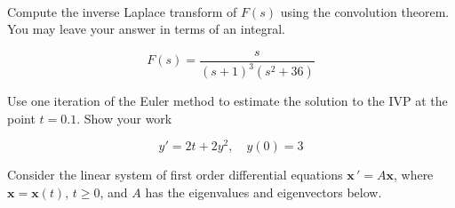 \documentclass[12pt]{exam}
\begin{document}
    


\newpage \Initials \\

\begin{questions}


    \question[5] %
    Compute the inverse Laplace transform of $F(s)$ using the convolution theorem. You may leave your answer in terms of an integral. 
    
    $$F(s) = \frac{s}{(s+1)^3(s^2+36)}$$  %
    
    
\newpage \Initials
    
    \question[2] %
    Use one iteration of the Euler method to estimate the solution to the IVP at the point $t = 0.1$. Show your work
    
    $$y' = 2t+2y^2, \quad y(0) = 3$$ %
    
    
    
\newpage \Initials

    \question[6] Consider the linear system of first order differential equations $\displaystyle \mathbf x \, ' = A \mathbf x$, where $\mathbf x = \mathbf x(t)$, $t\ge 0$, and $A$ has the eigenvalues and eigenvectors below. 



\end{questions}
\end{document}
